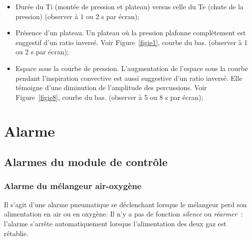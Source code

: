 \begin{itemize}
\item
  Durée du Ti (montée de pression et plateau) versus celle du Te (chute
  de la pression) (observer à 1 ou 2 s par écran);
\item
  Présence d'un plateau. Un plateau où la pression plafonne complètement
		est suggestif d'un ratio inversé. Voir Figure~\ref{figie1}, courbe du bas.
  (observer à 1 ou 2 s par écran);
\item
  Espace sous la courbe de pression. L'augmentation de l'espace sous la
  courbe pendant l'inspiration convective est aussi suggestive d'un
  ratio inversé. Elle témoigne d'une diminution de l'amplitude des
  percussions. Voir Figure~\ref{figie8}, courbe du bas. (observer à 5 ou 8 s par
  écran);
\end{itemize}
\begin{figure*}
	
	\caption{Rapport \ie\ adéquat (en haut) et rapport \ie\ inversé (en
	bas). On observe sur le tracé du bas un Te trop court ne permettant pas
	à la pression de redescendre entre chaque percussion. La pression
	d'équilibre est donc rapidement atteinte à la percussion suivante. Il en
	résulte une faible amplitude de variation de pression à chaque
	percussion. Vitesse de défilement à 1 s par écran.}
	\label{figie1}
\end{figure*}

\begin{figure*}
	
	\caption{Rapport \ie\ adéquat (en haut) et rapport \ie\ inversé (en
	bas). On observe une diminution de l'amplitude de percussion sur le
	tracé du bas. Vitesse de défilement à 8 s par écran.}
	\label{figie8}
\end{figure*}

\section{Alarme}

\subsection{Alarmes du module de contrôle}

\subsubsection*{Alarme du mélangeur air-oxygène}

Il s'agit d'une alarme pneumatique se déclenchant lorsque le mélangeur
perd son alimentation en air ou en oxygène. Il n'y a pas de fonction
\emph{silence} ou \emph{réarmer~}: l'alarme s'arrête automatiquement
lorsque l'alimentation des deux gaz est rétablie.

